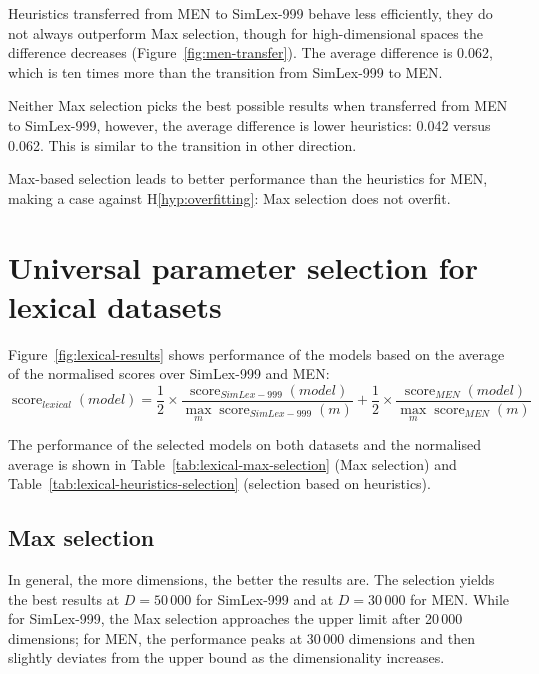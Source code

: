 Heuristics transferred from MEN to SimLex-999 behave less efficiently, they do not always outperform Max selection, though for high-dimensional spaces the difference decreases (Figure~\ref{fig:men-transfer}). The average difference is 0.062, which is ten times more than the transition from SimLex-999 to MEN.

Neither Max selection picks the best possible results when transferred from MEN to SimLex-999, however, the average difference is lower heuristics: 0.042 versus  0.062. This is similar to the transition in other direction.

Max-based selection leads to better performance than the heuristics for MEN, making a case against H\ref{hyp:overfitting}: Max selection does not overfit.

\section{Universal parameter selection for lexical datasets}
\label{sec:universal-lexical-param-selection}



Figure~\ref{fig:lexical-results} shows performance of the models based on the average of the normalised scores over SimLex-999 and MEN:
\begin{equation}
\operatorname{score}_\mathit{lexical}(\mathit{model}) =%
\frac{1}{2}\times%
\frac{\operatorname{score}_\mathit{SimLex-999}(\mathit{model})}%
{\max_m\operatorname{score}_\mathit{SimLex-999}(m)}%
+%
\frac{1}{2}\times%
\frac{\operatorname{score}_\mathit{MEN}(\mathit{model})}%
{\max_m\operatorname{score}_\mathit{MEN}(m)}%
\end{equation}

The performance of the selected models on both datasets and the normalised average is shown in Table~\ref{tab:lexical-max-selection} (Max selection) and Table~\ref{tab:lexical-heuristics-selection} (selection based on heuristics).



\subsection{Max selection}
\label{sec:max-selection}

In general, the more dimensions, the better the results are. The selection yields the best results at $D = 50\,000$ for SimLex-999 and at $D = 30\,000$ for MEN. While for SimLex-999, the Max selection approaches the upper limit after 20\,000 dimensions; for MEN, the performance peaks at 30\,000 dimensions and then slightly deviates from the upper bound as the dimensionality increases.

